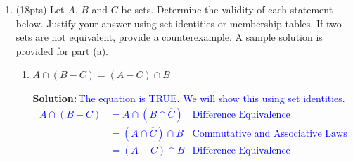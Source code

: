 \documentclass{article}
\newcommand{\ov}[1]{\overline{#1}}
\newcommand{\sol}[1]{\textbf{Solution:\,}\textcolor{blue}{#1}}
\begin{document}
\begin{enumerate}
\newpage

\item(18pts) Let $A$, $B$ and $C$ be sets. Determine the validity of each statement below. Justify your answer using set identities or membership tables. If two sets are not equivalent, provide a counterexample. A sample solution is provided for part (a).
\begin{enumerate}
\item $A \cap (B-C) = (A-C) \cap B$

\sol{The equation is TRUE. We will show this using set identities. 
\begin{align*}
A \cap (B-C)
 &= A \cap (B \cap \ov{C}) & \text{Difference Equivalence}\\
 &= (A \cap \ov{C}) \cap B & \text{Commutative and Associative Laws}\\
 &= (A - C) \cap B & \text{Difference Equivalence} \\
 \end{align*} 
}


\end{enumerate}
\end{enumerate}
\end{document}
